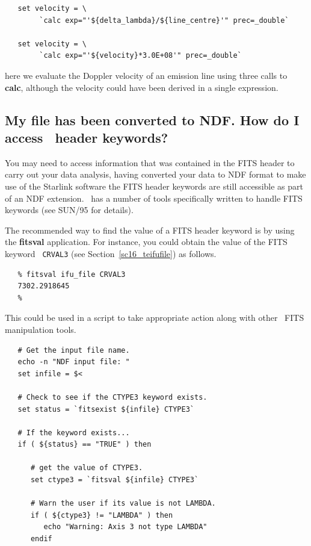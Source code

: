 \documentclass[twoside,11pt]{article}
\newcommand{\htmlref}[2]{#1}
\newcommand{\latex}[1]{#1}
\newcommand{\xref}[3]{#1}
\newcommand{\xlabel}[1]{}
\begin{document}
{\begin{verbatim}
   set velocity = \
        `calc exp="'${delta_lambda}/${line_centre}'" prec=_double`

   set velocity = \
        `calc exp="'${velocity}*3.0E+08'" prec=_double`
\end{verbatim}\normalsize

here we evaluate the Doppler velocity of an emission line using three calls 
to {\bf calc}, although the velocity could have been derived in a single
expression.

\subsection{\xlabel{sc16_fitsheader}My file has been converted to NDF.
How do I access \FITSref\ header keywords?\label{sc16_fitsheader}}

You may need to access information that was contained in the FITS
header to carry out your data analysis, having converted your data to
\xref{NDF}{sun33}{} format to make use of the Starlink software the
FITS header keywords are still accessible as part of an NDF extension.
\KAPPAref\ has a number of tools specifically written to handle
\xref{FITS keywords}{sun95}{se_fitsairlock}\latex{ (see SUN/95 for
details)}.

The recommended way to find the value of a FITS header keyword is by
using the \xref{{\bf fitsval}}{sun95}{FITSVAL} application.  For instance, you
could obtain the value of the FITS keyword \htmlref{{\tt
CRVAL3}}{sc16_teifufile}\latex{ (see
Section~\ref{sc16_teifufile})} as follows.

\small\begin{verbatim}
   % fitsval ifu_file CRVAL3
   7302.2918645
   %
\end{verbatim}\normalsize

This could be used in a script to take appropriate action along with
other \KAPPA\ \xref{FITS manipulation tools}{sun95}{se_fitsairlock}.

\small\begin{verbatim}
   # Get the input file name.
   echo -n "NDF input file: "
   set infile = $<
   
   # Check to see if the CTYPE3 keyword exists.
   set status = `fitsexist ${infile} CTYPE3`
   
   # If the keyword exists...
   if ( ${status} == "TRUE" ) then
   
      # get the value of CTYPE3.
      set ctype3 = `fitsval ${infile} CTYPE3`

      # Warn the user if its value is not LAMBDA.
      if ( ${ctype3} != "LAMBDA" ) then
         echo "Warning: Axis 3 not type LAMBDA"
      endif
      

\end{verbatim}}
\end{document}
